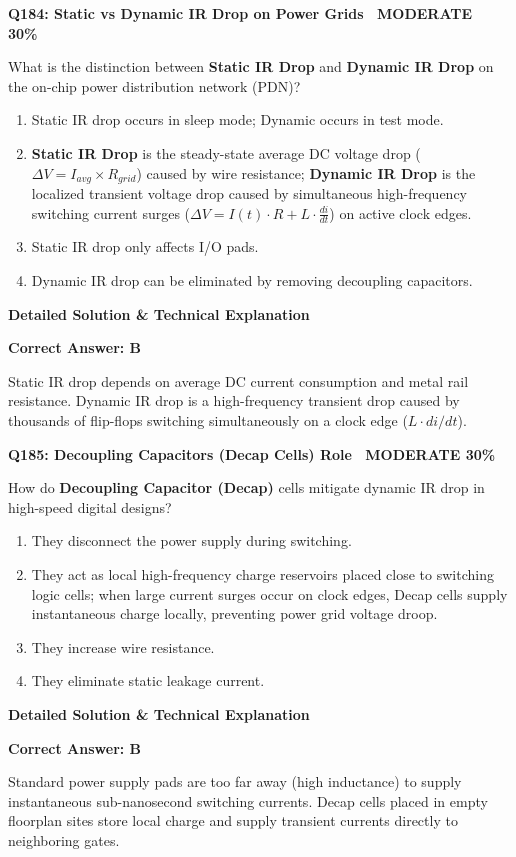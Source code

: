 \documentclass[11pt,a4paper]{article}
\newcommand{\badgemod}{{\color{white}\colorbox{modoran}{\bfseries\sffamily\tiny\ MODERATE 30\%\ }}}
\newenvironment{qbox}[2]{%
  \begin{mdframed}[style=qstyle]%
  {\bfseries\sffamily\color{primaryblue}#1 \hfill #2}\par\vspace{2pt}%
}{%
  \end{mdframed}%
}
\newenvironment{ansbox}{%
  \begin{mdframed}[style=ansstyle]%
  {\bfseries\sffamily\color{ansgreen}\small Detailed Solution \& Technical Explanation}\par\vspace{2pt}\small%
}{%
  \end{mdframed}%
}
\begin{document}
\begin{qbox}{Q184: Static vs Dynamic IR Drop on Power Grids}{\badgemod}
What is the distinction between \textbf{Static IR Drop} and \textbf{Dynamic IR Drop} on the on-chip power distribution network (PDN)?
\begin{enumerate}[label=\textbf{\Alph*.}]
  \item Static IR drop occurs in sleep mode; Dynamic occurs in test mode.
  \item \textbf{Static IR Drop} is the steady-state average DC voltage drop ($\Delta V = I_{avg} \times R_{grid}$) caused by wire resistance; \textbf{Dynamic IR Drop} is the localized transient voltage drop caused by simultaneous high-frequency switching current surges ($\Delta V = I(t) \cdot R + L \cdot \frac{di}{dt}$) on active clock edges.
  \item Static IR drop only affects I/O pads.
  \item Dynamic IR drop can be eliminated by removing decoupling capacitors.
\end{enumerate}
\end{qbox}
\begin{ansbox}
\textbf{Correct Answer: B}

Static IR drop depends on average DC current consumption and metal rail resistance. Dynamic IR drop is a high-frequency transient drop caused by thousands of flip-flops switching simultaneously on a clock edge ($L \cdot di/dt$).
\end{ansbox}

\begin{qbox}{Q185: Decoupling Capacitors (Decap Cells) Role}{\badgemod}
How do \textbf{Decoupling Capacitor (Decap)} cells mitigate dynamic IR drop in high-speed digital designs?
\begin{enumerate}[label=\textbf{\Alph*.}]
  \item They disconnect the power supply during switching.
  \item They act as local high-frequency charge reservoirs placed close to switching logic cells; when large current surges occur on clock edges, Decap cells supply instantaneous charge locally, preventing power grid voltage droop.
  \item They increase wire resistance.
  \item They eliminate static leakage current.
\end{enumerate}
\end{qbox}
\begin{ansbox}
\textbf{Correct Answer: B}

Standard power supply pads are too far away (high inductance) to supply instantaneous sub-nanosecond switching currents. Decap cells placed in empty floorplan sites store local charge and supply transient currents directly to neighboring gates.
\end{ansbox}
\end{document}
